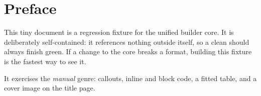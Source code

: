 \chapter*{Preface}

This tiny document is a regression fixture for the unified builder core. It is
deliberately self-contained: it references nothing outside itself, so a clean
 should always finish green. If a change to the core breaks a
format, building this fixture is the fastest way to see it.

It exercises the \emph{manual} genre: callouts, inline and block code, a fitted
table, and a cover image on the title page.
